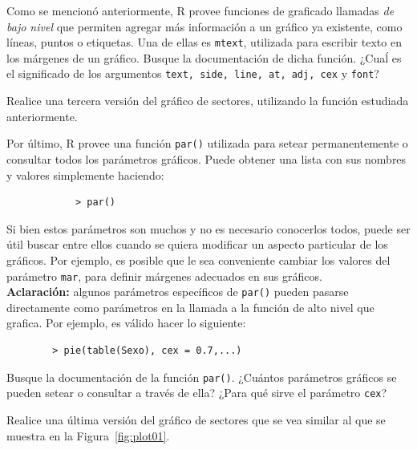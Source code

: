 \documentclass{../prob}
\begin{document}
\begin{problema}
	\begin{parte}
		Como se mencionó anteriormente, R provee funciones de graficado llamadas \textit{de bajo nivel} que permiten agregar más información a un gráfico ya existente, como líneas, puntos o etiquetas. Una de ellas es \texttt{mtext}, utilizada para escribir texto en los márgenes de un gráfico. Busque la documentación de dicha función. ¿Cuaĺ es el significado de los argumentos \texttt{text, side, line, at, adj, cex} y \texttt{font}? 
	\end{parte}
	
	\begin{parte}
		Realice una tercera versión del gráfico de sectores, utilizando la función estudiada anteriormente.
	\end{parte}
	
	\begin{parte}
		Por último, R provee una función \texttt{par()} utilizada para setear permanentemente o consultar todos los parámetros gráficos. Puede obtener una lista con sus nombres y valores simplemente haciendo:
		\begin{verbatim}
		    > par()
		\end{verbatim}
	Si bien estos parámetros son muchos y no es necesario conocerlos todos, puede ser útil buscar entre ellos cuando se quiera modificar un aspecto particular de los gráficos. Por ejemplo, es posible que le sea conveniente cambiar los valores del parámetro \texttt{mar}, para definir márgenes adecuados en sus gráficos. \\
	
	\textbf{Aclaración:} algunos parámetros específicos de \texttt{par()} pueden pasarse directamente como parámetros en la llamada a la función de alto nivel que grafica. Por ejemplo, es válido hacer lo siguiente:
	\begin{verbatim}
	    > pie(table(Sexo), cex = 0.7,...)
	\end{verbatim}
\medskip	
	Busque la documentación de la función \texttt{par()}. ¿Cuántos parámetros gráficos se pueden setear o consultar a través de ella? ¿Para qué sirve el parámetro \texttt{cex}?
	\end{parte}
		
	\begin{parte}	
	Realice una última versión del gráfico de sectores que se vea similar al que se muestra en la Figura~\ref{fig:plot01}.
	\end{parte}

	\end{problema}
	
\end{document}
